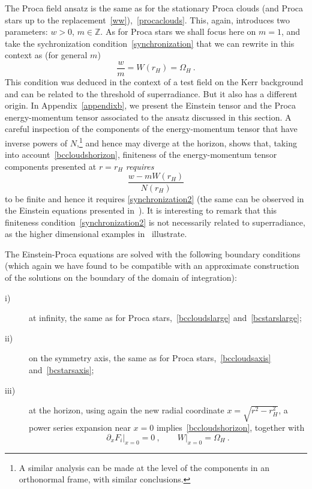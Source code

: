 The Proca field ansatz is the same as for the stationary Proca clouds (and Proca stars up to the replacement~\eqref{ww}),~\eqref{procaclouds}. This, again, introduces two parameters: $w>0$, $m\in \mathbb{Z}$. As for Proca stars we shall focus here on $m=1$, and take the sychronization condition~\eqref{synchronization} that we can rewrite in this context as (for general $m$)
\begin{equation}
\frac{w}{m}=W(r_H) =\Omega_H\ . 
\label{synchronization2}
\end{equation}
This condition was deduced in the context of a test field on the Kerr background and can be related to the threshold of superradiance. But it also has a different origin. In Appendix~\ref{appendixb}, we present the Einstein tensor and the Proca energy-momentum tensor associated to the ansatz discussed in this section. A careful inspection of the components of the energy-momentum tensor that have inverse powers of $N$,\footnote{A similar analysis can be made at the level of the components in an orthonormal frame, with similar conclusions.} and hence may diverge at the horizon, shows that, taking into account~\eqref{bccloudshorizon}, finiteness of the energy-momentum tensor components presented at $r=r_H$ \textit{requires}
\begin{equation}
\frac{w-mW(r_H)}{N(r_H)} 
\end{equation}
to be finite and hence it requires \eqref{synchronization2} (the same can be observed in the Einstein equations presented in~\cite{Herdeiro:2015gia}). It is interesting to remark that this finiteness condition~\eqref{synchronization2} is not necessarily related to superradiance, as the higher dimensional examples in~\cite{Brihaye:2014nba,Herdeiro:2015kha} illustrate. 




The Einstein-Proca equations are solved with the following boundary conditions (which again we have found to be compatible with an approximate construction of the solutions
on the boundary of the domain of integration):  
\begin{description}
\item[i)] at infinity, the same as for Proca stars,~\eqref{bccloudslarge} and~\eqref{bcstarslarge};
\item[ii)] on the symmetry axis, the same as for Proca stars,~\eqref{bccloudsaxis} and~\eqref{bcstarsaxis};
 
\item[iii)] at the horizon, using again the new radial coordinate $x=\sqrt{r^2-r_H^2}$, a power series expansion near $x=0$ implies~\eqref{bccloudshorizon}, together with
\begin{equation}
\partial_x F_i\big|_{x=0}=0 \ , \qquad W\big|_{x=0}=\Omega_H \ .
\end{equation}
\end{description}
 
